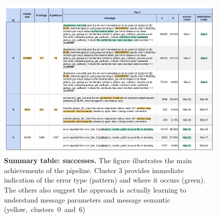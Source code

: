 \begin{landscape}
\begin{figure}
    \centering
    \includegraphics[width=\linewidth]{figures/510_results/cluster-summary-successes_annotated_printed.pdf}
    \caption{\textbf{Summary table: successes.}
    The figure illustrates the main achievements of the pipeline. 
    Cluster 3 provides immediate indication of the error type (pattern) and where it occurs (green).
    The others also suggest the approach is actually learning to understand message parameters and message semantic \mbox{(yellow, clusters 0 and 6)}
    }
    \label{fig:cluster_summary:successes}
\end{figure}
\end{landscape}

